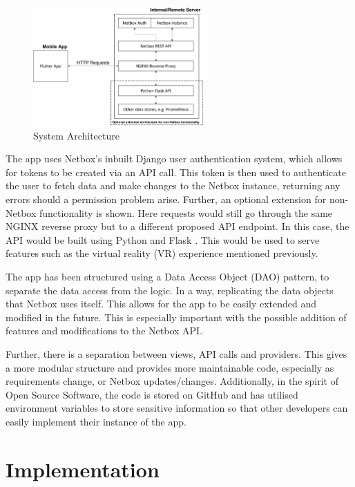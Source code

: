 \documentclass [11pt,a4paper]{article}
\begin{document}
\begin{figure}[H]
    \centering
    \includegraphics[width=0.6\textwidth]{images/top-level-archi2.png}
    \caption{System Architecture}
    \label{fig:architecture}
\end{figure}

The app uses Netbox's inbuilt Django user authentication system, which allows for tokens to be created via an API call. This token is then used to authenticate the user to fetch data and make changes to the Netbox instance, returning any errors should a permission problem arise. Further, an optional extension for non-Netbox functionality is shown. Here requests would still go through the same NGINX reverse proxy but to a different proposed API endpoint. In this case, the API would be built using Python and Flask \cite{flask}. This would be used to serve features such as the virtual reality (VR) experience mentioned previously.

The app has been structured using a Data Access Object (DAO) pattern\cite{dao}, to separate the data access from the logic. In a way, replicating the data objects that Netbox uses itself. This allows for the app to be easily extended and modified in the future. This is especially important with the possible addition of features and modifications to the Netbox API.

Further, there is a separation between views, API calls and providers. This gives a more modular structure and provides more maintainable code, especially as requirements change, or Netbox updates/changes. Additionally, in the spirit of Open Source Software, the code is stored on GitHub \cite{keeptrackgithub} and has utilised environment variables to store sensitive information so that other developers can easily implement their instance of the app.

\section{Implementation}
\label{sec:implementation}
\end{document}
